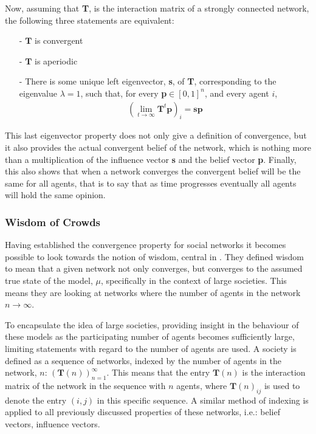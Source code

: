 \documentclass{article}
\newcommand{\T}{\textbf{T}}
\newcommand{\Soc}{(\T(n))^{\infty}_{n=1}}
\begin{document}
Now, assuming that \T, is the interaction matrix of a strongly connected network, the following three statements are equivalent:
\begin{itemize}
    \item[-] $\T$ is convergent
    \item[-] $\T$ is aperiodic
    \item[-] There is some unique left eigenvector, \textbf{s}, of \T, corresponding to the eigenvalue $\lambda=1$, such that, for every \textbf{p}$\in [0,1]^n$, and every agent $i$,
    \begin{align*}
        (\lim_{t\to\infty}\T^t\textbf{p})_i = \textbf{sp}
    \end{align*}
\end{itemize}

 This last eigenvector property does not only give a definition of convergence, but it also provides the actual convergent belief of the network, which is nothing more than a multiplication of the influence vector \textbf{s} and the belief vector \textbf{p}. Finally, this also shows that when a network converges the convergent belief will be the same for all agents, that is to say that as time progresses eventually all agents will hold the same opinion.

\newpage

\subsubsection{Wisdom of Crowds}

Having established the convergence property for social networks it becomes possible to look towards the notion of wisdom, central in \cite{golub2010naive}. They defined wisdom to mean that a given network not only converges, but converges to the assumed true state of the model, $\mu$, specifically in the context of large societies. This means they are looking at networks where the number of agents in the network $n\to\infty$.

To encapsulate the idea of large societies, providing insight in the behaviour of these models as the participating number of agents becomes sufficiently large, limiting statements with regard to the number of agents are used. A society is defined as a sequence of networks, indexed by the number of agents in the network, $n$: $\Soc$. This means that the entry $\textbf{T}(n)$ is the interaction matrix of the network in the sequence with $n$ agents, where $\textbf{T}(n)_{ij}$ is used to denote the entry $(i,j)$ in this specific sequence. A similar method of indexing is applied to all previously discussed properties of these networks, i.e.: belief vectors, influence vectors.
\end{document}

